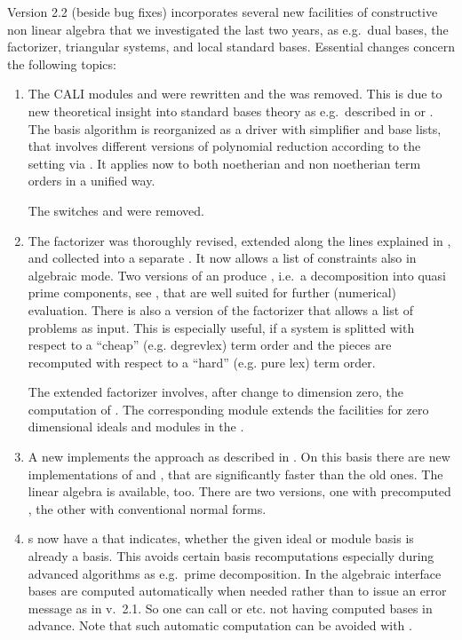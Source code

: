 Version 2.2 (beside bug fixes) incorporates several new facilities of
constructive non linear algebra that we investigated the last two
years, as e.g.\ dual bases, the \gr factorizer, triangular systems, and
local standard bases. Essential changes concern the following topics:
\begin{enumerate}
\item The CALI modules  and  were rewritten and
the  was removed. This is
due to new theoretical insight into standard bases theory as
e.g.\ described in \cite{tcah} or \cite{ala}. The \gr basis algorithm
is reorganized as a \gr driver with simplifier and base lists, that
involves different versions of polynomial reduction according to the
setting via . It applies now to
both noetherian and non noetherian term orders in a unified way.

The switches  and  were removed.

\item The \gr factorizer was thoroughly revised, extended along the
lines explained in \cite{fgb}, and collected into a separate
. It now allows a list of constraints also in
algebraic mode. Two versions of an 
produce ,
i.e.\ a decomposition into quasi prime components, see \cite{efgb},
that are well suited for further (numerical) evaluation. There is also
a version of the \gr factorizer that allows a list of problems as
input. This is especially useful, if a system is splitted with respect
to a ``cheap'' (e.g. degrevlex) term order and the pieces are
recomputed with respect to a ``hard'' (e.g. pure lex) term order.

The extended \gr factorizer involves, after change to dimension zero,
the computation of . The corresponding module
 extends the facilities for zero dimensional ideals and
modules in the .

\item A new  implements the  approach
as described in \cite{MMM}. On this basis there are new
implementations of  and , that
are significantly faster than the old ones. The linear algebra
 \cite{FGLM} is available, too. There are
two versions, one with precomputed , the other with
conventional normal forms.

\item {}s now have a  that indicates, whether the
given ideal or module basis is already a \gr basis. This avoids
certain \gr basis recomputations especially during advanced algorithms
as e.g.\ prime decomposition. In the algebraic interface \gr bases are
computed automatically when needed rather than to issue an error
message as in v.\ 2.1. So one can call  or 
etc. not having computed \gr bases in advance. Note that such
automatic computation can be avoided with .


\end{enumerate}
